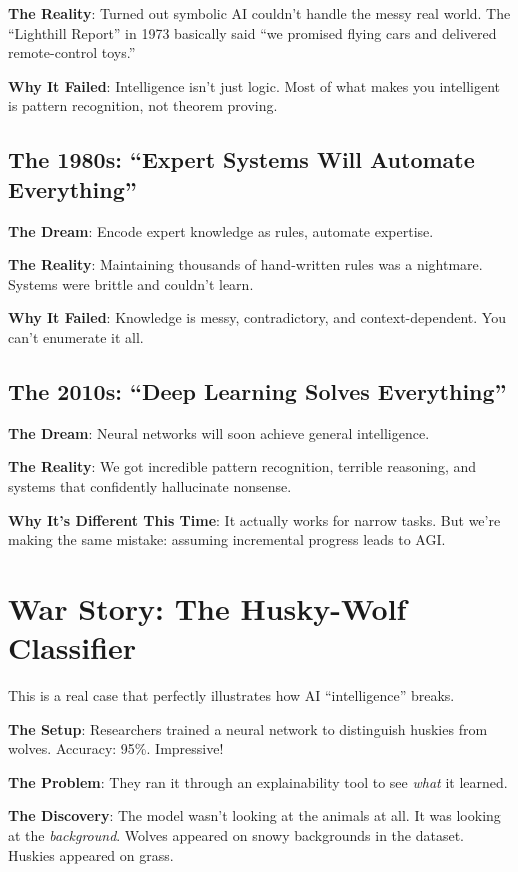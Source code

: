 \textbf{The Reality}: Turned out symbolic AI couldn't handle the messy real world. The ``Lighthill Report'' in 1973 basically said ``we promised flying cars and delivered remote-control toys.''

\textbf{Why It Failed}: Intelligence isn't just logic. Most of what makes you intelligent is pattern recognition, not theorem proving.

\subsection{The 1980s: ``Expert Systems Will Automate Everything''}
\textbf{The Dream}: Encode expert knowledge as rules, automate expertise.

\textbf{The Reality}: Maintaining thousands of hand-written rules was a nightmare. Systems were brittle and couldn't learn.

\textbf{Why It Failed}: Knowledge is messy, contradictory, and context-dependent. You can't enumerate it all.

\subsection{The 2010s: ``Deep Learning Solves Everything''}
\textbf{The Dream}: Neural networks will soon achieve general intelligence.

\textbf{The Reality}: We got incredible pattern recognition, terrible reasoning, and systems that confidently hallucinate nonsense.

\textbf{Why It's Different This Time}: It actually works for narrow tasks. But we're making the same mistake: assuming incremental progress leads to AGI.

\section{War Story: The Husky-Wolf Classifier}

This is a real case that perfectly illustrates how AI ``intelligence'' breaks.

\textbf{The Setup}: Researchers trained a neural network to distinguish huskies from wolves. Accuracy: 95\%. Impressive!

\textbf{The Problem}: They ran it through an explainability tool to see \textit{what} it learned.

\textbf{The Discovery}: The model wasn't looking at the animals at all. It was looking at the \textit{background}. Wolves appeared on snowy backgrounds in the dataset. Huskies appeared on grass.


